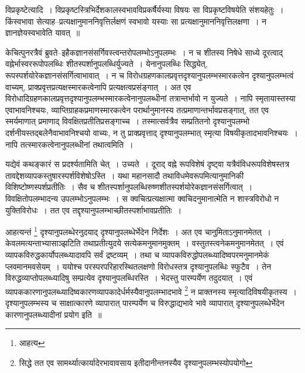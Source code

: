 \documentclass[article,12pt,a4paper]{memoir}
\begin{document}
	  \endgroup
	 

	  \pstart विप्रकृष्टेत्यादि । विप्रकृष्टस्त्रिभिर्देशकालस्वभावविप्रकर्षैर्यस्या विषयः सा विप्रकृष्टविषयेति संशयहेतुः । किंस्वभावा सेत्याह--प्रत्यक्षानुमाननिवृत्तिर्लक्षणं स्वभावो यस्याः सा प्रत्यक्षानुमाननिवृत्तिलक्षणा । न ज्ञानज्ञेयस्वभावेति यावत् ॥
	\pend
      
	  \endgroup
	

	  \pstart केचित्पुनरत्रैवं ब्रुवते--इहैकज्ञानसंसर्गिवस्त्वन्तरोपलम्भोऽनुपलम्भः । न च शीतस्य निषेधे साध्ये दूरत्वाद् वह्नेर्भास्वररूपोपलब्धिः शीतस्पर्शानुपलब्धिर्युज्यते । येनानुपलब्धिः सिद्ध्येत्, रूपस्पर्शयोरेकज्ञानसंसर्गित्वाभावात् । \leavevmode{} न च विरोधग्रहणकालप्रवृत्तदृश्यानुपलम्भस्मारकत्वेन दृश्यानुपलम्भत्वं वाच्यम्, प्राक्प्रवृत्तप्रत्यक्षस्मारकत्वेनापि प्रत्यक्षत्वप्रसंङ्गात् । अत एव विरोधादिग्रहणकालप्रवृत्तदृश्यानुपलम्भस्मारकत्वेनानुपलब्धीनां तत्रान्तर्भावो न युज्यते । नापि स्मृतायास्तस्या एवाभावनिश्चयः, व्याप्तिग्राहकप्रमाणस्मारकत्वेन परार्थानुमानस्य तत्प्रमाणान्तर्भावप्रसङ्गात्, तत एव स्मर्यमाणात् प्रमाणाद् विवक्षितप्रतीतिप्रसङ्गाच्च । तस्मात्सर्वत्रैव सम्प्रतितनो दृश्यानुपलम्भो दर्शनीयस्तद्बलेनैवाभावनिश्चयो वाच्यः, न तु प्राक्प्रवृत्ताद् दृश्यानुपलम्भात् स्मृत्या विषयीकृतादभावनिश्चयः । नापि तत्स्मारकत्वेनानुपलब्धीनां तथात्वमिति ।
	\pend
      

	  \pstart यद्येवं कथङ्कारं स प्रदर्श्यतामिति चेत् । उच्यते । दूराद् वह्ने रूपविशेषं दृष्ट्वा यत्रैवंविधरूपविशेषस्तत्र तावद्देशव्यापकस्तुषारस्पर्शविशेषोऽस्ति । यथा महानसादौ तथाविधमेवरूपमित्यानुमानिकी विशिष्टोष्णस्पर्शप्रतीतिः । सैव च शीतस्पर्शानुपलब्धिरुष्णशीतस्पर्शयोरेकज्ञानसंसर्गित्वात् । विवक्षितोपलम्भादन्य उपलम्भोऽनुपलम्भः । स क्वचित्प्रत्यक्षात्मा क्वचिदनुमानात्मेति न शास्त्रविरोधो न युक्तिविरोधः । तत एव तद्दृश्यानुपलम्भाच्छीतस्पर्शाभावप्रतीतिः ।
	\pend
      

	  \pstart आहत्यन्तं \footnote{आहत्य} दृश्यानुपलब्धेरनुदयाद् दृश्यानुपलब्धेर्भेदेन निर्देशः । अत एव चानुमिताऽनुमानमेतत् । केवलमत्यन्ताभ्यासाञ्झटिति तथाप्रतीत्युदये सत्येकमनुमानमुक्तम् । वस्तुतस्त्वनेकमनुमानमेतत् । एवं व्यापकविरुद्धकार्योपलब्ध्यादावपि सर्वं द्रष्टव्यम् । तथा च व्यापकविरुद्धोपलब्ध्यादिष्वपरमनुमानमेकं प्लवमानमवसेयम् । ययोश्च परस्परपरिहारस्थितलक्षणो विरोधस्तत्र दृश्यानुपलब्धिः स्फुटैव । तेन विरुद्धव्याप्तोपलब्ध्यादिषु सम्प्रत्येव दृश्यानुपलब्धिरस्ति । भेदस्तु पारम्पर्येण तदुदयात् । एवं व्यापककारणानुपलब्ध्यादिष्वकारणव्यापकादेर्धर्मस्यैवानुपलम्भादभावे \footnote{सिद्धे तत एव सामर्थ्यात्कार्यादेरभावावसाय इतीदानीन्तनस्यैव दृश्यानुपलम्भस्योपयोगो} न प्राक्तनस्य स्मृत्यादिविषयीकृतस्य । दृश्यानुपलम्भस्य च साक्षात्कारणे व्यापारात् पारम्पर्येण च विरुद्धाद्यभावे भावे व्यापारात् दृश्यानुपलब्धेर्भेदेन कारणानुपलब्ध्यादीनां प्रयोग इति ॥
	\pend
	  \bigskip
	  \begingroup
	
\end{document}
